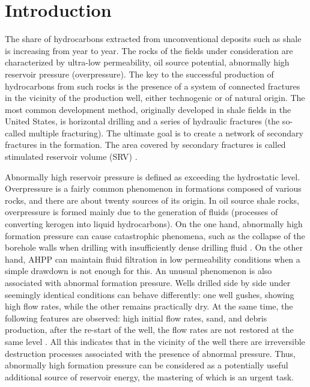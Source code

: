 \documentclass[article,authoryear,jpm]{beg_39}             %
\begin{document}


\maketitle




\section{Introduction}
\label{intro}
The share of hydrocarbons extracted from unconventional deposits such as shale is increasing from year to year.
The rocks of the fields under consideration are characterized by ultra-low permeability, oil source potential, abnormally high reservoir pressure (overpressure).
The key to the successful production of hydrocarbons from such rocks is the presence of a system of connected fractures in the vicinity of the production well, either technogenic or of natural origin.
The most common development method, originally developed in shale fields in the United States, is horizontal drilling and a series of hydraulic fractures (the so-called multiple fracturing). The ultimate goal is to create a network of secondary fractures in the formation.
The area covered by secondary fractures is called stimulated reservoir volume (SRV) \cite{Warpinski, Wu, Barati, Ma2015}.

Abnormally high reservoir pressure is defined as exceeding the hydrostatic level.
Overpressure is a fairly common phenomenon in formations composed of various rocks, and there are about twenty sources of its origin.
In oil source shale rocks, overpressure is formed mainly due to the generation of fluids (processes of converting kerogen into liquid hydrocarbons).
On the one hand, abnormally high formation pressure can cause catastrophic phenomena, such as the collapse of the borehole walls when drilling with insufficiently dense drilling fluid \cite{Ma2015, Li}.
On the other hand, AHPP can maintain fluid filtration in low permeability conditions when a simple drawdown is not enough for this.
An unusual phenomenon is also associated with abnormal formation pressure.
Wells drilled side by side under seemingly identical conditions can behave differently: one well gushes, showing high flow rates, while the other remains practically dry.
At the same time, the following features are observed: high initial flow rates, sand, and debris production, after the re-start of the well, the flow rates are not restored at the same level \cite{Alekseev}.
All this indicates that in the vicinity of the well there are irreversible destruction processes associated with the presence of abnormal pressure.
Thus, abnormally high formation pressure can be considered as a potentially useful additional source of reservoir energy, the mastering of which is an urgent task.
\end{document}

